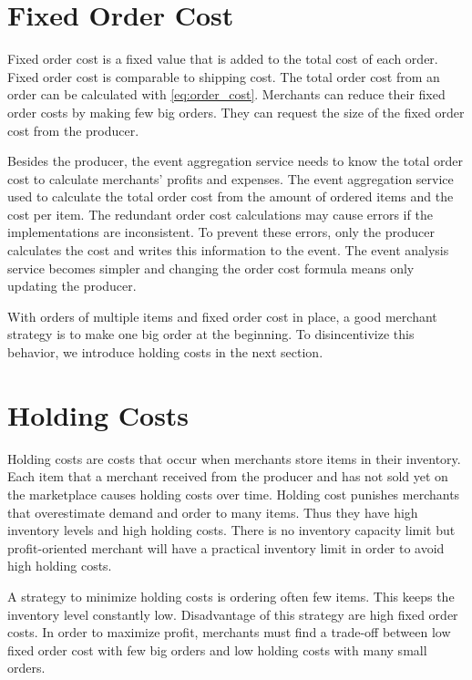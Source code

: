 \section{Fixed Order Cost}
\label{section:fixed_order_cost}
Fixed order cost is a fixed value that is added to the total cost of each order.
Fixed order cost is comparable to shipping cost.
The total order cost from an order can be calculated with \cref{eq:order_cost}.
Merchants can reduce their fixed order costs by making few big orders.
They can request the size of the fixed order cost from the producer.

Besides the producer, the event aggregation service needs to know the total order cost to calculate merchants' profits and expenses.
The event aggregation service used to calculate the total order cost from the amount of ordered items and the cost per item.
The redundant order cost calculations may cause errors if the implementations are inconsistent.
To prevent these errors, only the producer calculates the cost and writes this information to the event.
The event analysis service becomes simpler and changing the order cost formula means only updating the producer.

With orders of multiple items and fixed order cost in place, a good merchant strategy is to make one big order at the beginning.
To disincentivize this behavior, we introduce holding costs in the next section.

\section{Holding Costs}
\label{section:holding_cost}
Holding costs are costs that occur when merchants store items in their inventory.
Each item that a merchant received from the producer and has not sold yet on the marketplace causes holding costs over time.
Holding cost punishes merchants that overestimate demand and order to many items.
Thus they have high inventory levels and high holding costs.
There is no inventory capacity limit but profit-oriented merchant will have a practical inventory limit in order to avoid high holding costs.

A strategy to minimize holding costs is ordering often few items.
This keeps the inventory level constantly low.
Disadvantage of this strategy are high fixed order costs.
In order to maximize profit, merchants must find a trade-off between low fixed order cost with few big orders and low holding costs with many small orders.

